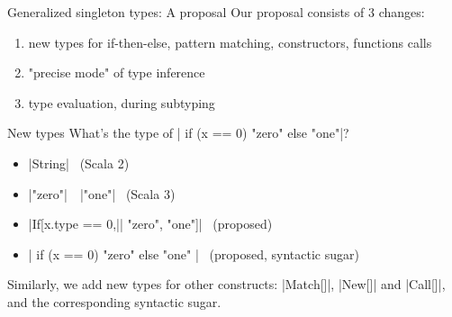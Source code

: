 \documentclass[10pt]{beamer}
\newenvironment{slide}[2][]
  {\begin{frame}[fragile,environment=slide,#1]{#2}}
  {\end{frame}}
\begin{document}
\begin{slide}{Generalized singleton types: A proposal}
Our proposal consists of 3 changes:
\begin{enumerate}
  \item new types for if-then-else, pattern matching, constructors, functions calls
  \item "precise mode" of type inference
  \item type evaluation, during subtyping
\end{enumerate}
\end{slide}

\begin{slide}{New types}
What's the type of | if (x == 0) "zero" else "one"|?
\begin{itemize}
  \pause\item |String| ~(Scala 2)
  \pause\item |"zero"|~{\footnotesize\texttt\textbar}~|"one"| ~(Scala 3)
  \pause\item |If[x.type == 0,|| "zero", "one"]| ~(proposed)
  \pause\item |{ if (x == 0) "zero" else "one" }| ~(proposed, syntactic sugar)
\end{itemize}
\pause
Similarly, we add new types for other constructs: |Match[]|, |New[]| and |Call[]|, and the corresponding syntactic sugar.
\end{slide}
\end{document}
